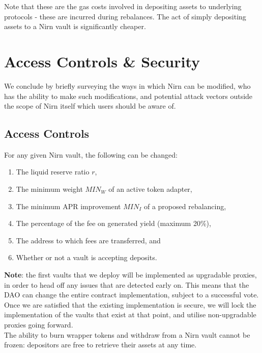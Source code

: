 \documentclass{article}
\begin{document}
\noindent
Note that these are the gas costs involved in depositing assets to underlying protocols - these are incurred during rebalances. The act of simply depositing assets to a Nirn vault is significantly cheaper.

\newpage
\section{Access Controls \& Security}

We conclude by briefly surveying the ways in which Nirn can be modified, who has the ability to make such modifications, and potential attack vectors outside the scope of Nirn itself which users should be aware of.

\subsection{Access Controls}

\noindent
For any given Nirn vault, the following can be changed:

\begin{enumerate}
    \item The liquid reserve ratio $r$,
    \item The minimum weight $MIN_W$ of an active token adapter,
    \item The minimum APR improvement $MIN_I$ of a proposed rebalancing,
    \item The percentage of the fee on generated yield (maximum 20\%),
    \item The address to which fees are transferred, and
    \item Whether or not a vault is accepting deposits.
\end{enumerate}

\noindent
\textbf{Note}: the first vaults that we deploy will be implemented as upgradable proxies, in order to head off any issues that are detected early on. This means that the DAO can change the entire contract implementation, subject to a successful vote. Once we are satisfied that the existing implementation is secure, we will lock the implementation of the vaults that exist at that point, and utilise non-upgradable proxies going forward.\\

\noindent
The ability to burn wrapper tokens and withdraw from a Nirn vault cannot be frozen: depositors are free to retrieve their assets at any time.\\
\end{document}
